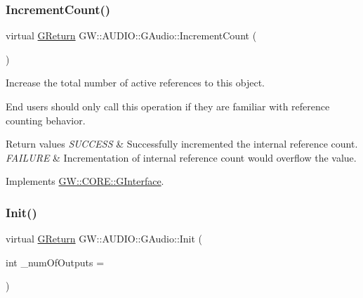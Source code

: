 \mbox{\label{classGW_1_1AUDIO_1_1GAudio_aba5697a3a308026ecaa12737d6fe6705}} 
\subsubsection{\texorpdfstring{IncrementCount()}{IncrementCount()}}
{\footnotesize\ttfamily virtual \mbox{\hyperlink{namespaceGW_a67a839e3df7ea8a5c5686613a7a3de21}{G\+Return}} G\+W\+::\+A\+U\+D\+I\+O\+::\+G\+Audio\+::\+Increment\+Count (\begin{DoxyParamCaption}{ }\end{DoxyParamCaption})\hspace{0.3cm}{\ttfamily [pure virtual]}}



Increase the total number of active references to this object. 

End users should only call this operation if they are familiar with reference counting behavior.


\begin{DoxyRetVals}{Return values}
{\em S\+U\+C\+C\+E\+SS} & Successfully incremented the internal reference count. \\
\hline
{\em F\+A\+I\+L\+U\+RE} & Incrementation of internal reference count would overflow the value. \\
\hline
\end{DoxyRetVals}


Implements \mbox{\hyperlink{classGW_1_1CORE_1_1GInterface_a2d710f20bb78e544e8309b5b75c21260}{G\+W\+::\+C\+O\+R\+E\+::\+G\+Interface}}.

\mbox{\label{classGW_1_1AUDIO_1_1GAudio_ab4084083e5b785d9a8ed74f768788ca2}} 
\subsubsection{\texorpdfstring{Init()}{Init()}}
{\footnotesize\ttfamily virtual \mbox{\hyperlink{namespaceGW_a67a839e3df7ea8a5c5686613a7a3de21}{G\+Return}} G\+W\+::\+A\+U\+D\+I\+O\+::\+G\+Audio\+::\+Init (\begin{DoxyParamCaption}\item[{int}]{\+\_\+num\+Of\+Outputs = {} }\end{DoxyParamCaption})\hspace{0.3cm}{\ttfamily [pure virtual]}}



